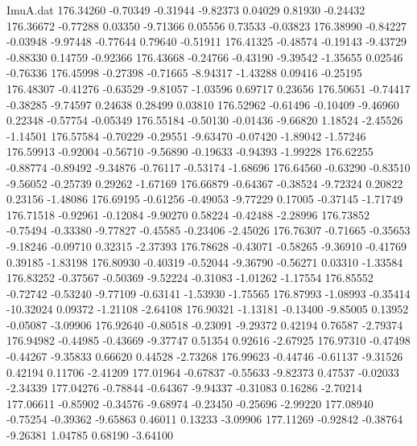 \begin{filecontents}{ImuA.dat}
 176.34260   -0.70349   -0.31944   -9.82373    0.04029    0.81930   -0.24432
 176.36672   -0.77288    0.03350   -9.71366    0.05556    0.73533   -0.03823
 176.38990   -0.84227   -0.03948   -9.97448   -0.77644    0.79640   -0.51911
 176.41325   -0.48574   -0.19143   -9.43729   -0.88330    0.14759   -0.92366
 176.43668   -0.24766   -0.43190   -9.39542   -1.35655    0.02546   -0.76336
 176.45998   -0.27398   -0.71665   -8.94317   -1.43288    0.09416   -0.25195
 176.48307   -0.41276   -0.63529   -9.81057   -1.03596    0.69717    0.23656
 176.50651   -0.74417   -0.38285   -9.74597    0.24638    0.28499    0.03810
 176.52962   -0.61496   -0.10409   -9.46960    0.22348   -0.57754   -0.05349
 176.55184   -0.50130   -0.01436   -9.66820    1.18524   -2.45526   -1.14501
 176.57584   -0.70229   -0.29551   -9.63470   -0.07420   -1.89042   -1.57246
 176.59913   -0.92004   -0.56710   -9.56890   -0.19633   -0.94393   -1.99228
 176.62255   -0.88774   -0.89492   -9.34876   -0.76117   -0.53174   -1.68696
 176.64560   -0.63290   -0.83510   -9.56052   -0.25739    0.29262   -1.67169
 176.66879   -0.64367   -0.38524   -9.72324    0.20822    0.23156   -1.48086
 176.69195   -0.61256   -0.49053   -9.77229    0.17005   -0.37145   -1.71749
 176.71518   -0.92961   -0.12084   -9.90270    0.58224   -0.42488   -2.28996
 176.73852   -0.75494   -0.33380   -9.77827   -0.45585   -0.23406   -2.45026
 176.76307   -0.71665   -0.35653   -9.18246   -0.09710    0.32315   -2.37393
 176.78628   -0.43071   -0.58265   -9.36910   -0.41769    0.39185   -1.83198
 176.80930   -0.40319   -0.52044   -9.36790   -0.56271    0.03310   -1.33584
 176.83252   -0.37567   -0.50369   -9.52224   -0.31083   -1.01262   -1.17554
 176.85552   -0.72742   -0.53240   -9.77109   -0.63141   -1.53930   -1.75565
 176.87993   -1.08993   -0.35414  -10.32024    0.09372   -1.21108   -2.64108
 176.90321   -1.13181   -0.13400   -9.85005    0.13952   -0.05087   -3.09906
 176.92640   -0.80518   -0.23091   -9.29372    0.42194    0.76587   -2.79374
 176.94982   -0.44985   -0.43669   -9.37747    0.51354    0.92616   -2.67925
 176.97310   -0.47498   -0.44267   -9.35833    0.66620    0.44528   -2.73268
 176.99623   -0.44746   -0.61137   -9.31526    0.42194    0.11706   -2.41209
 177.01964   -0.67837   -0.55633   -9.82373    0.47537   -0.02033   -2.34339
 177.04276   -0.78844   -0.64367   -9.94337   -0.31083    0.16286   -2.70214
 177.06611   -0.85902   -0.34576   -9.68974   -0.23450   -0.25696   -2.99220
 177.08940   -0.75254   -0.39362   -9.65863    0.46011    0.13233   -3.09906
 177.11269   -0.92842   -0.38764   -9.26381    1.04785    0.68190   -3.64100

\end{filecontents}
